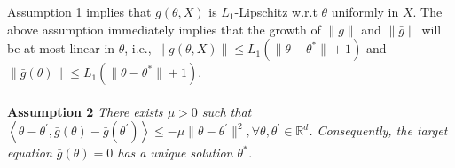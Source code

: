 \documentclass[a4paper]{article}
\newcommand{\norm}[1]{\|#1 \|}
\newcommand{\thetastar}{\theta^*}
\begin{document}
Assumption 1 implies that $g\left(\theta, X\right)$ is $L_{1}$-Lipschitz w.r.t $\theta$ uniformly in $X$. The above assumption immediately implies that the growth of $\norm{g}$ and $\norm{\bar{g}}$ will be at most linear in $\theta$, i.e., $\norm{g\left(\theta, X\right)} \le L_{1}\left(\norm{\theta - \thetastar} + 1\right)$ and $\norm{\bar{g}\left(\theta\right)} \le L_{1}\left(\norm{\theta - \thetastar} + 1\right)$. 
\\
\\
\textbf{Assumption 2} \textit{
	There exists $\mu > 0$ such that $\left\langle \theta - \theta^{\prime}, \bar{g}(\theta) - \bar{g}(\theta^{\prime}) \right\rangle \le -\mu\norm{\theta - \theta^{\prime}}^{2}, \forall \theta, \theta^{\prime} \in \mathbb{R}^{d}$. Consequently, the target equation $\bar{g}(\theta) = 0$ has a unique solution $\thetastar$.
}
\\
\end{document}

